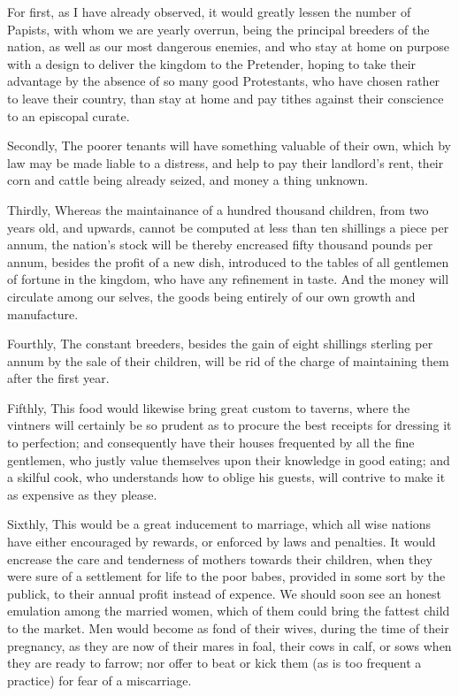 For first, as I have already observed, it would greatly lessen the number of Papists, with whom we are yearly overrun, being the principal breeders of the nation, as well as our most dangerous enemies, and who stay at home on purpose with a design to deliver the kingdom to the Pretender, hoping to take their advantage by the absence of so many good Protestants, who have chosen rather to leave their country, than stay at home and pay tithes against their conscience to an episcopal curate.\par

Secondly, The poorer tenants will have something valuable of their own, which by law may be made liable to a distress, and help to pay their landlord’s rent, their corn and cattle being already seized, and money a thing unknown.\par

Thirdly, Whereas the maintainance of a hundred thousand children, from two years old, and upwards, cannot be computed at less than ten shillings a piece per annum, the nation’s stock will be thereby encreased fifty thousand pounds per annum, besides the profit of a new dish, introduced to the tables of all gentlemen of fortune in the kingdom, who have any refinement in taste. And the money will circulate among our selves, the goods being entirely of our own growth and manufacture.\par

Fourthly, The constant breeders, besides the gain of eight shillings sterling per annum by the sale of their children, will be rid of the charge of maintaining them after the first year.\par

Fifthly, This food would likewise bring great custom to taverns, where the vintners will certainly be so prudent as to procure the best receipts for dressing it to perfection; and consequently have their houses frequented by all the fine gentlemen, who justly value themselves upon their knowledge in good eating; and a skilful cook, who understands how to oblige his guests, will contrive to make it as expensive as they please.\par

Sixthly, This would be a great inducement to marriage, which all wise nations have either encouraged by rewards, or enforced by laws and penalties. It would encrease the care and tenderness of mothers towards their children, when they were sure of a settlement for life to the poor babes, provided in some sort by the publick, to their annual profit instead of expence. We should soon see an honest emulation among the married women, which of them could bring the fattest child to the market. Men would become as fond of their wives, during the time of their pregnancy, as they are now of their mares in foal, their cows in calf, or sows when they are ready to farrow; nor offer to beat or kick them (as is too frequent a practice) for fear of a miscarriage.\par

